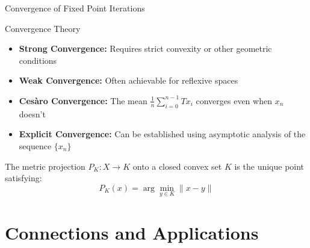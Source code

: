 \documentclass[aspectratio=169,10pt]{beamer}
\begin{document}
\begin{frame}{Convergence of Fixed Point Iterations}
    \begin{block}{Convergence Theory}
        \begin{itemize}
            \item \textbf{Strong Convergence:} Requires strict convexity or other geometric conditions

            \item \textbf{Weak Convergence:} Often achievable for reflexive spaces

            \item \textbf{Cesàro Convergence:} The mean $\frac{1}{n}\sum_{i=0}^{n-1} Tx_i$ converges even when $x_n$ doesn't

            \item \textbf{Explicit Convergence:} Can be established using asymptotic analysis of the sequence $\{x_n\}$
        \end{itemize}
    \end{block}

    \vspace{0.5cm}

    \begin{definition}
        The metric projection $P_K: X \to K$ onto a closed convex set $K$ is the unique point satisfying:
        \[
        P_K(x) = \arg\min_{y \in K} \|x - y\|
        \]
    \end{definition}
\end{frame}

\section{Connections and Applications}
\end{document}
